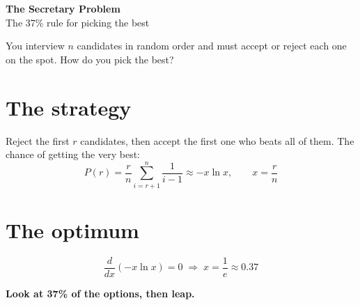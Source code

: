 \documentclass[11pt]{article}
\begin{document}
\begin{center}
  {\LARGE\bfseries The Secretary Problem}\\[4pt]
  {\large The 37\% rule for picking the best}
\end{center}

You interview \(n\) candidates in random order and must accept
or reject each one on the spot. How do you pick the best?

\section*{The strategy}
Reject the first \(r\) candidates, then accept the first one
who beats all of them. The chance of getting the very best:
\[
  P(r) = \frac{r}{n} \sum_{i=r+1}^{n} \frac{1}{i - 1}
  \approx -x \ln x, \qquad x = \frac{r}{n}
\]

\section*{The optimum}
\[
  \frac{d}{dx}(-x \ln x) = 0 \;\Rightarrow\; x = \frac{1}{e} \approx 0.37
\]

\begin{center}
\end{center}

\centerline{\bfseries Look at 37\% of the options, then leap.}
\end{document}
